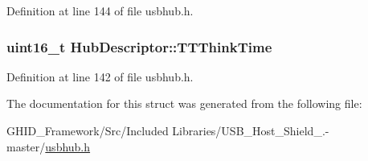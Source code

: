 \-Definition at line 144 of file usbhub.\-h.

\hypertarget{struct_hub_descriptor_a00002f5db3d923aa11645bfde3cd650e}{
\subsubsection[{\-T\-T\-Think\-Time}]{\setlength{\rightskip}{0pt plus 5cm}uint16\-\_\-t {\bf \-Hub\-Descriptor\-::\-T\-T\-Think\-Time}}}\label{struct_hub_descriptor_a00002f5db3d923aa11645bfde3cd650e}


\-Definition at line 142 of file usbhub.\-h.



\-The documentation for this struct was generated from the following file\-:\begin{DoxyCompactItemize}
\item 
\-G\-H\-I\-D\-\_\-\-Framework/\-Src/\-Included Libraries/\-U\-S\-B\-\_\-\-Host\-\_\-\-Shield\-\_.-\/master/\hyperlink{usbhub_8h}{usbhub.\-h}\end{DoxyCompactItemize}
